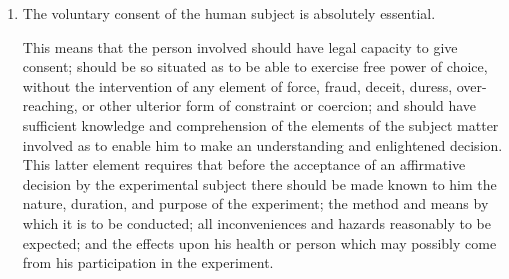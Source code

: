 \documentclass[12pt] {article}
\begin{document}
\begin{enumerate}
\def\labelenumi{\arabic{enumi}.}
\item
  The voluntary consent of the human subject is absolutely essential.

  This means that the person involved should have legal capacity to give
  consent; should be so situated as to be able to exercise free power of
  choice, without the intervention of any element of force, fraud,
  deceit, duress, over-reaching, or other ulterior form of constraint or
  coercion; and should have sufficient knowledge and comprehension of
  the elements of the subject matter involved as to enable him to make
  an understanding and enlightened decision. This latter element
  requires that before the acceptance of an affirmative decision by the
  experimental subject there should be made known to him the nature,
  duration, and purpose of the experiment; the method and means by which
  it is to be conducted; all inconveniences and hazards reasonably to be
  expected; and the effects upon his health or person which may possibly
  come from his participation in the experiment.


\end{enumerate}
\end{document}
